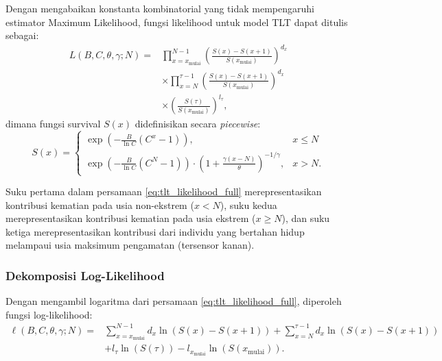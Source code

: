 Dengan mengabaikan konstanta kombinatorial yang tidak mempengaruhi estimator Maximum Likelihood, fungsi likelihood untuk model TLT dapat ditulis sebagai:
\begin{equation}
\begin{split}
L(B, C, \theta, \gamma; N) = &\prod_{x=x_{\text{mulai}}}^{N-1} \left(\frac{S(x) - S(x+1)}{S(x_{\text{mulai}})}\right)^{d_x} \\
&\times \prod_{x=N}^{\tau-1} \left(\frac{S(x) - S(x+1)}{S(x_{\text{mulai}})}\right)^{d_x} \\
&\times \left(\frac{S(\tau)}{S(x_{\text{mulai}})}\right)^{l_\tau},
\end{split}
\label{eq:tlt_likelihood_full}
\end{equation}
dimana fungsi survival $S(x)$ didefinisikan secara \textit{piecewise}:
\begin{equation}
S(x) = 
\begin{cases}
\exp\left(-\frac{B}{\ln C}(C^x - 1)\right), & x \leq N \\[10pt]
\exp\left(-\frac{B}{\ln C}(C^N - 1)\right) \cdot \left(1 + \frac{\gamma(x-N)}{\theta}\right)^{-1/\gamma}, & x > N.
\end{cases}
\label{eq:tlt_survival_piecewise}
\end{equation}

Suku pertama dalam persamaan \eqref{eq:tlt_likelihood_full} merepresentasikan kontribusi kematian pada usia non-ekstrem ($x < N$), suku kedua merepresentasikan kontribusi kematian pada usia ekstrem ($x \geq N$), dan suku ketiga merepresentasikan kontribusi dari individu yang bertahan hidup melampaui usia maksimum pengamatan (tersensor kanan).

\subsubsection{Dekomposisi Log-Likelihood}

Dengan mengambil logaritma dari persamaan \eqref{eq:tlt_likelihood_full}, diperoleh fungsi log-likelihood:
\begin{equation}
\begin{split}
\ell(B, C, \theta, \gamma; N) = &\sum_{x=x_{\text{mulai}}}^{N-1} d_x \ln(S(x) - S(x+1)) + \sum_{x=N}^{\tau-1} d_x \ln(S(x) - S(x+1)) \\
&+ l_\tau \ln(S(\tau)) - l_{x_{\text{mulai}}} \ln(S(x_{\text{mulai}})).
\end{split}
\label{eq:tlt_loglik_expanded}
\end{equation}

